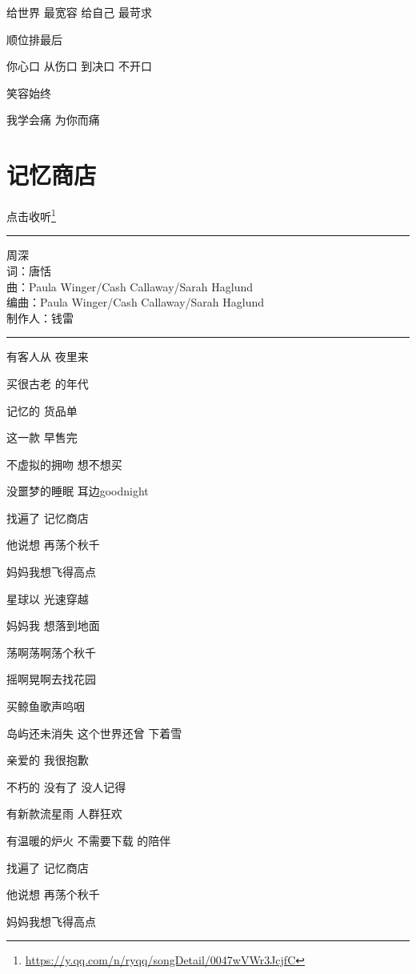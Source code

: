 \documentclass[]{ctexbook}
\renewcommand{\href}[2]{#2\footnote{\url{#1}}}
\begin{document}
给世界 最宽容 给自己 最苛求

顺位排最后

你心口 从伤口 到决口 不开口

笑容始终

我学会痛 为你而痛

\section*{记忆商店}\label{the-memory-store}


\href{https://y.qq.com/n/ryqq/songDetail/0047wVWr3JcjfC}{点击收听}

\begin{center}\rule{0.5\linewidth}{0.5pt}\end{center}

周深\\
词：唐恬\\
曲：Paula Winger/Cash Callaway/Sarah Haglund\\
编曲：Paula Winger/Cash Callaway/Sarah Haglund\\
制作人：钱雷

\begin{center}\rule{0.5\linewidth}{0.5pt}\end{center}

有客人从 夜里来

买很古老 的年代

记忆的 货品单

这一款 早售完

不虚拟的拥吻 想不想买

没噩梦的睡眠 耳边goodnight

找遍了 记忆商店

他说想 再荡个秋千

妈妈我想飞得高点

星球以 光速穿越

妈妈我 想落到地面

荡啊荡啊荡个秋千

摇啊晃啊去找花园

买鲸鱼歌声呜咽

岛屿还未消失 这个世界还曾 下着雪

亲爱的 我很抱歉

不朽的 没有了 没人记得

有新款流星雨 人群狂欢

有温暖的炉火 不需要下载 的陪伴

找遍了 记忆商店

他说想 再荡个秋千

妈妈我想飞得高点
\end{document}
